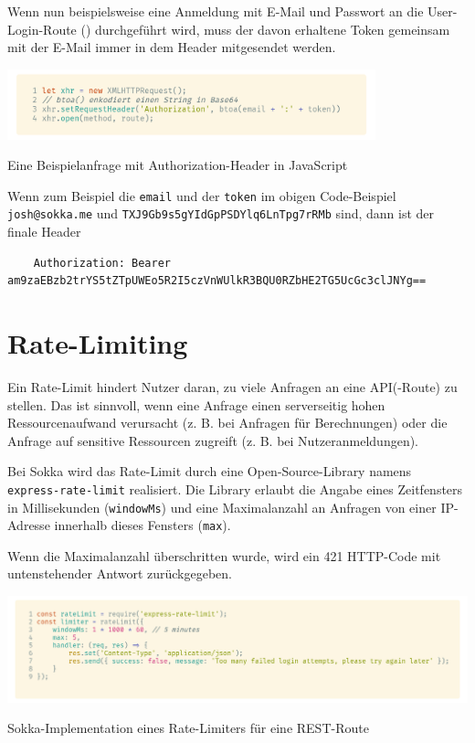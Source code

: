 Wenn nun beispielsweise eine Anmeldung mit E-Mail und Passwort an die User-Login-Route () durchgeführt wird, muss der davon erhaltene Token gemeinsam mit der E-Mail immer in dem Header mitgesendet werden.

\begin{code}[htp]
    \begin{center}
        \includegraphics[width=0.8\textwidth]{images/Backend/xhr.png}
        \vspace{-12pt}
        \caption{Eine Beispielanfrage mit Authorization-Header in JavaScript}
    \end{center}
\end{code}

Wenn zum Beispiel die \lstinline{email} und der \lstinline{token} im obigen Code-Beispiel \lstinline{josh@sokka.me} und \lstinline{TXJ9Gb9s5gYIdGpPSDYlq6LnTpg7rRMb} sind, dann ist der finale Header

\begin{lstlisting}
    Authorization: Bearer am9zaEBzb2trYS5tZTpUWEo5R2I5czVnWUlkR3BQU0RZbHE2TG5UcGc3clJNYg==
\end{lstlisting}

\section{Rate-Limiting}

Ein Rate-Limit hindert Nutzer daran, zu viele Anfragen an eine API(-Route) zu stellen. Das ist sinnvoll, wenn eine Anfrage einen serverseitig hohen Ressourcenaufwand verursacht (z. B. bei Anfragen für Berechnungen) oder die Anfrage auf sensitive Ressourcen zugreift (z. B. bei Nutzeranmeldungen).

Bei Sokka wird das Rate-Limit durch eine Open-Source-Library namens \lstinline{express-rate-limit} realisiert. Die Library erlaubt die Angabe eines Zeitfensters in Millisekunden (\lstinline{windowMs}) und eine Maximalanzahl an Anfragen von einer IP-Adresse innerhalb dieses Fensters (\lstinline{max}).

Wenn die Maximalanzahl überschritten wurde, wird ein 421 HTTP-Code mit untenstehender Antwort zurückgegeben. \cite{nfriedly2021}

\begin{code}[htp]
    \begin{center}
        \includegraphics[width=1\textwidth]{images/Backend/ratelimit.png}
        \vspace{-25pt}
        \caption{Sokka-Implementation eines Rate-Limiters für eine REST-Route}
    \end{center}
\end{code}

